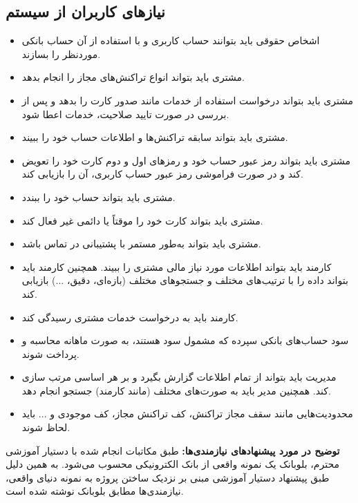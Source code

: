 \documentclass{article}
\begin{document}
    \subsection{نیازهای کاربران از سیستم}
        \begin{itemize}
            \item اشخاص حقوقی باید بتوانند حساب کاربری و با استفاده از آن حساب بانکی موردنظر را بسازند.
            \item مشتری باید بتواند انواع تراکنش‌های مجاز را انجام بدهد.
            \item مشتری باید بتواند درخواست استفاده از خدمات مانند صدور کارت را بدهد و پس از بررسی در صورت تایید صلاحیت، خدمات اعطا شود.
            \item مشتری باید بتواند سابقه تراکنش‌ها و اطلاعات حساب‌ خود را ببیند.
            \item مشتری باید بتواند رمز عبور حساب خود و رمزهای اول و دوم کارت خود را تعویض کند و در صورت فراموشی رمز عبور حساب کاربری، آن را بازیابی کند.
            \item مشتری باید بتواند حساب‌ خود را ببندد.
            \item مشتری باید بتواند کارت‌ خود را موقتاً یا دائمی غیر فعال کند.
            \item مشتری باید بتواند به‌طور مستمر با پشتیبانی در تماس باشد.
            \item کارمند باید بتواند اطلاعات مورد نیاز مالی مشتری را ببیند. همچنین کارمند باید بتواند 
            داده را با ترتیب‌های مختلف و جستجوهای مختلف (بازه‌ای، دقیق، ...) بازیابی کند.
            \item کارمند باید به درخواست خدمات مشتری رسیدگی کند.
            \item سود حساب‌های بانکی سپرده که مشمول سود هستند، به صورت ماهانه محاسبه و پرداخت شوند.
            \item مدیریت باید بتواند از تمام اطلاعات گزارش بگیرد و بر هر اساسی مرتب سازی کند. همچنین مدیر باید 
            به صورت‌های مختلف (مانند کارمند) جستجو انجام دهد.
            \item محدودیت‌هایی مانند سقف مجاز تراکنش، کف تراکنش مجاز، کف موجودی و ... باید لحاظ شوند. 
        \end{itemize}

\textbf{توضیح در مورد پیشنهادهای نیازمندی‌ها:}
طبق مکاتبات انجام شده با دستیار آموزشی محترم، بلوبانک یک نمونه واقعی از بانک الکترونیکی 
محسوب می‌شود. به همین دلیل طبق پیشنهاد دستیار آموزشی مبنی بر نزدیک ساختن پروژه به نمونه دنیای واقعی،
نیازمندی‌ها مطابق بلوبانک نوشته شده است. 
    
\end{document}
